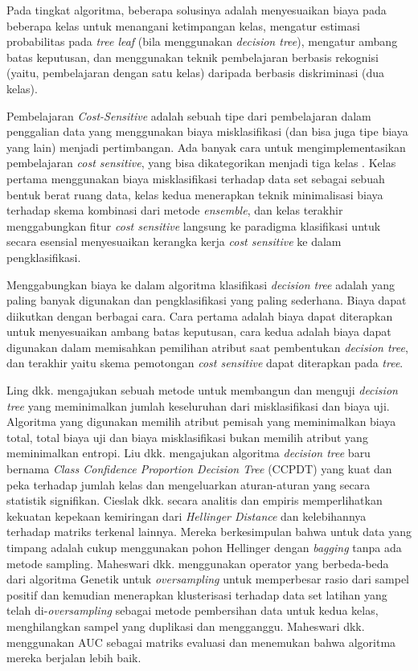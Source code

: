 \documentclass[12pt,a4paper,titlepage]{article}
\begin{document}
Pada tingkat algoritma, beberapa solusinya adalah menyesuaikan biaya pada beberapa kelas untuk menangani ketimpangan kelas, mengatur estimasi probabilitas pada \textit{tree leaf} (bila menggunakan \textit{decision tree}), mengatur ambang batas keputusan, dan menggunakan teknik pembelajaran berbasis rekognisi (yaitu, pembelajaran dengan satu kelas) daripada berbasis diskriminasi (dua kelas).

Pembelajaran \textit{Cost-Sensitive} adalah sebuah tipe dari pembelajaran dalam penggalian data yang menggunakan biaya misklasifikasi (dan bisa juga tipe biaya yang lain) menjadi pertimbangan.
Ada banyak cara untuk mengimplementasikan pembelajaran \textit{cost sensitive}, yang bisa dikategorikan menjadi tiga kelas \cite{he2009learning}.
Kelas pertama menggunakan biaya misklasifikasi terhadap data set sebagai sebuah bentuk berat ruang data, kelas kedua menerapkan teknik minimalisasi biaya terhadap skema kombinasi dari metode \textit{ensemble}, dan kelas terakhir menggabungkan fitur \textit{cost sensitive} langsung ke paradigma klasifikasi untuk secara esensial menyesuaikan kerangka kerja \textit{cost sensitive} ke dalam pengklasifikasi.

Menggabungkan biaya ke dalam algoritma klasifikasi \textit{decision tree} adalah yang paling banyak digunakan dan pengklasifikasi yang paling sederhana.
Biaya dapat diikutkan dengan berbagai cara.
Cara pertama adalah biaya dapat diterapkan untuk menyesuaikan ambang batas keputusan, cara kedua adalah biaya dapat digunakan dalam memisahkan pemilihan atribut saat pembentukan \textit{decision tree}, dan terakhir yaitu skema pemotongan \textit{cost sensitive} dapat diterapkan pada \textit{tree}.

Ling dkk. \cite{ling2004decision} mengajukan sebuah metode untuk membangun dan menguji \textit{decision tree} yang meminimalkan jumlah keseluruhan dari misklasifikasi dan biaya uji.
Algoritma yang digunakan memilih atribut pemisah yang meminimalkan biaya total, total biaya uji dan biaya misklasifikasi bukan memilih atribut yang meminimalkan entropi.
Liu dkk. \cite{liu2010robust} mengajukan algoritma \textit{decision tree} baru bernama \textit{Class Confidence Proportion Decision Tree} (CCPDT) yang kuat dan peka terhadap jumlah kelas dan mengeluarkan aturan-aturan yang secara statistik signifikan.
Cieslak dkk. \cite{cieslak2012hellinger} secara analitis dan empiris memperlihatkan kekuatan kepekaan kemiringan dari \textit{Hellinger Distance} dan kelebihannya terhadap matriks terkenal lainnya.
Mereka berkesimpulan bahwa untuk data yang timpang adalah cukup menggunakan pohon Hellinger dengan \textit{bagging} tanpa ada metode sampling.
Maheswari dkk. \cite{maheshwari2011new} menggunakan operator yang berbeda-beda dari algoritma Genetik untuk \textit{oversampling} untuk memperbesar rasio dari sampel positif dan kemudian menerapkan klusterisasi terhadap data set latihan yang telah di-\textit{oversampling} sebagai metode pembersihan data untuk kedua kelas, menghilangkan sampel yang duplikasi dan mengganggu.
Maheswari dkk. menggunakan AUC sebagai matriks evaluasi dan menemukan bahwa algoritma mereka berjalan lebih baik.
\end{document}
